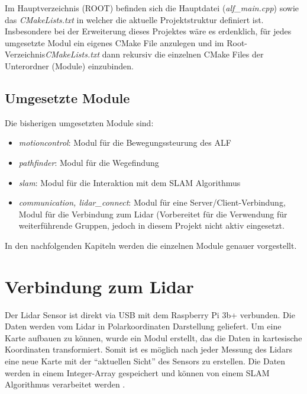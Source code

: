 Im Hauptverzeichnis (ROOT) befinden sich die Hauptdatei (\textit{alf\_main.cpp}) sowie das \textit{CMakeLists.txt} in welcher die aktuelle Projektstruktur definiert ist. Insbesondere bei der Erweiterung dieses Projektes wäre es erdenklich, für jedes umgesetzte Modul ein eigenes CMake File anzulegen und im Root-Verzeichnis\textit{CMakeLists.txt} dann rekursiv die einzelnen CMake Files der Unterordner (Module) einzubinden. 


\subsection*{Umgesetzte Module}

Die bisherigen umgesetzten Module sind: 

\begin{itemize}
\item \textit{motioncontrol}: Modul für die Bewegungssteurung des ALF
\item \textit{pathfinder}: Modul für die Wegefindung 
\item \textit{slam}: Modul für die Interaktion mit dem SLAM Algorithmus

\item \textit{communication, lidar\_connect}: Modul für eine Server/Client-Verbindung, Modul für die Verbindung zum Lidar (Vorbereitet für die Verwendung für weiterführende Gruppen, jedoch in diesem Projekt nicht aktiv eingesetzt.
\end{itemize}

In den nachfolgenden Kapiteln werden die einzelnen Module genauer vorgestellt. 












\section{Verbindung zum Lidar}

Der Lidar Sensor ist direkt via USB mit dem Raspberry Pi 3b+ verbunden. Die Daten werden vom Lidar in Polarkoordinaten Darstellung geliefert. Um eine Karte aufbauen zu können, wurde ein Modul erstellt, das die Daten in kartesische Koordinaten transformiert. Somit ist es möglich nach jeder Messung des Lidars eine neue Karte mit der "`aktuellen Sicht"' des Sensors zu erstellen. Die Daten werden in einem Integer-Array gespeichert und können von einem SLAM Algorithmus verarbeitet werden . 

